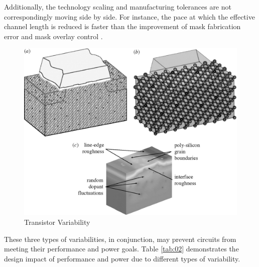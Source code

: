 \documentclass[ecp,tc, english]{iiufrgs}
\begin{document}
Additionally, the technology scaling and manufacturing tolerances are not correspondingly moving side by side. For instance, the pace at which the effective channel length is reduced is faster than the improvement of mask fabrication error and mask overlay control \cite{nassif:08} \cite{aghababa2009static}.

\begin{figure}[ht]
\centering
\includegraphics[width=.5\textwidth]{transistorVariability.jpg}
\caption{Transistor Variability}
\label{fig:Fig2}
\end{figure}

These three types of variabilities, in conjunction, may prevent circuits from meeting their performance and power goals. Table \ref{tab:02} demonstrates the design impact of performance and power due to different types of variability.

\begin{table}[H]
\centering
\caption{Design impact on performance and power due to different types of variability}
\label{tab:02}
\end{table}
\end{document}
